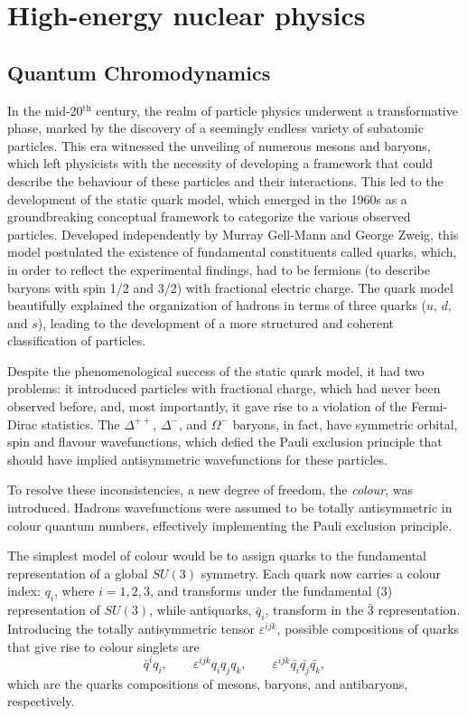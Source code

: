 \chapter{High-energy nuclear physics}
\section{Quantum Chromodynamics}
In the mid-20$^{\mathrm{th}}$ century, the realm of particle physics underwent a transformative phase, marked by the discovery of a seemingly endless variety of subatomic particles. This era witnessed the unveiling of numerous mesons and baryons, which left physicists with the necessity of developing a framework that could describe the behaviour of these particles and their interactions. This led to the development of the static quark model, which emerged in the 1960s as a groundbreaking conceptual framework to categorize the various observed particles. Developed independently by Murray Gell-Mann\cite{Gell-Mann:1964ewy} and George Zweig\cite{Zweig:1964jf, Fritzsch:1972jv}, this model postulated the existence of fundamental constituents called quarks, which, in order to reflect the experimental findings, had to be fermions (to describe baryons with spin 1/2 and 3/2) with fractional electric charge. The quark model beautifully explained the organization of hadrons in terms of three quarks ($u$, $d$, and $s$), leading to the development of a more structured and coherent classification of particles.

Despite the phenomenological success of the static quark model, it had two problems: it introduced particles with fractional charge, which had never been observed before, and, most importantly, it gave rise to a violation of the Fermi-Dirac statistics. The $\Delta^{++}$, $\Delta^{-}$, and $\Omega^{-}$ baryons, in fact, have symmetric orbital, spin and flavour wavefunctions, which defied the Pauli exclusion principle that should have implied antisymmetric wavefunctions for these particles.

To resolve these inconsistencies, a new degree of freedom, the \emph{colour}, was introduced. Hadrons wavefunctions were assumed to be totally antisymmetric in colour quantum numbers, effectively implementing the Pauli exclusion principle.

The simplest model of colour would be to assign quarks to the fundamental representation of a global $SU(3)$ symmetry. Each quark now carries a colour index: $q_i$, where $i = 1, 2, 3$, and transforms under the fundamental ($3$) representation of $SU(3)$, while antiquarks,  $\bar{q}_i$, transform in the $\bar{3}$ representation. Introducing the totally antisymmetric tensor $\varepsilon^{ijk}$, possible compositions of quarks that give rise to colour singlets are 
\begin{equation*}
    \bar{q}^iq_i,\qquad \varepsilon^{ijk}q_iq_jq_k,\qquad \varepsilon^{ijk}\bar{q_i}\bar{q_j}\bar{q_k},
\end{equation*}
which are the quarks compositions of mesons, baryons, and antibaryons, respectively. 

